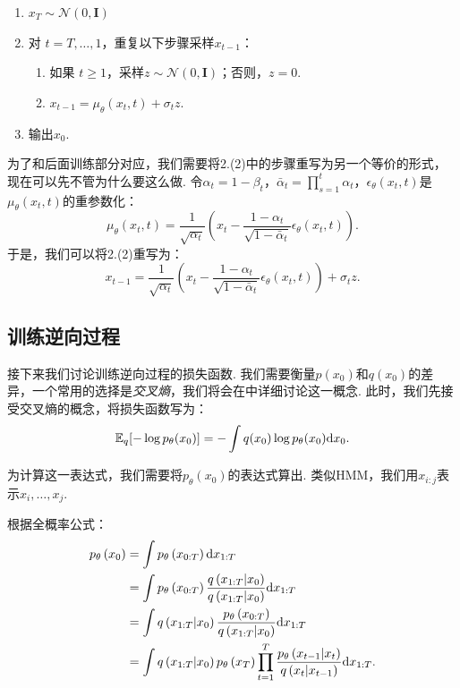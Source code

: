 \begin{enumerate}
    \item $x_T \sim \mathcal{N}(0, \mathbf{I})$
    \item 对 $t = T, \ldots, 1$，重复以下步骤采样$x_{t-1}$：
    \begin{enumerate}
        \item 如果 $t\geq 1$，采样$z \sim \mathcal{N}(0, \mathbf{I})$；否则，$z = 0$.
        \item $x_{t-1} = \mu_\theta(x_t,t) + \sigma_t z$.
    \end{enumerate}
    \item 输出$x_0$.
\end{enumerate}

为了和后面训练部分对应，我们需要将2.(2)中的步骤重写为另一个等价的形式，现在可以先不管为什么要这么做. 令$\alpha_t=1-\beta_t$，$\bar\alpha_t=\prod_{s=1}^t\alpha_t$，$\epsilon_\theta(x_t, t)$是$\mu_\theta(x_t,t)$的重参数化：
\[
\mu_{\theta}(x_t, t) =  \frac{1}{\sqrt{\alpha_t}} \left( x_t - \frac{1-\alpha_t}{\sqrt{1 - \bar{\alpha}_t}}\epsilon_{\theta}(x_t, t) \right).
\]
于是，我们可以将2.(2)重写为：
\[x_{t-1} = \frac{1}{\sqrt{\alpha_t}} \left( x_t - \frac{1-\alpha_t}{\sqrt{1-\bar\alpha_t}} \epsilon_\theta(x_t, t) \right) + \sigma_t z.\]


\subsection{训练逆向过程}

接下来我们讨论训练逆向过程的损失函数. 我们需要衡量$p(x_0)$和$q(x_0)$的差异，一个常用的选择是\emph{交叉熵}，我们将会在中详细讨论这一概念. 此时，我们先接受交叉熵的概念，将损失函数写为：
\[
\mathbb{E}_q[-\log p_\theta(x_0)]=-\int q(x_0)\log p_\theta(x_0)\mathrm{d} x_0.
\]

为计算这一表达式，我们需要将$p_\theta(x_0)$的表达式算出. 类似HMM，我们用$x_{i:j}$表示$x_i,\dots,x_j$. 

根据全概率公式：
\[
    \begin{aligned}
        p_\theta\left(x_{0}\right)&=\int  p_\theta\left(x_{0:T}\right) \mathrm{d}  x_{1:T}\\
            &= \int p_\theta\left(x_{0:T}\right) \frac{q\left(x_{1:T} | x_{0}\right)}{q\left(x_{1:T} | x_{0}\right)} \mathrm{d}  x_{1:T} \\
        &= \int q\left(x_{1:T} | x_{0}\right) \frac{p_\theta\left(x_{0:T}\right)}{q\left(x_{1:T} | x_{0}\right)} \mathrm{d}  x_{1:T} \\
        &= \int q\left(x_{1:T} | x_{0}\right) p_\theta\left(x_{T}\right) \prod_{t=1}^T \frac{p_\theta\left(x_{t-1} | x_{t}\right)}{q\left(x_{t} | x_{t-1}\right)}\mathrm{d}  x_{1:T}.
    \end{aligned}    
\]

